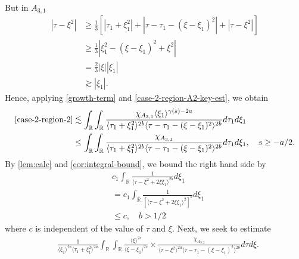 \documentclass[12pt,reqno]{amsart}
\numberwithin{equation}{section}  %
\numberwithin{figure}{section}
\newcommand{\rr}{\mathbb{R}}
\theoremstyle{plain}
\theoremstyle{definition}
\theoremstyle{remark}
\begin{document}
%
%
%
But in $A_{3,1}$
%
%
\begin{equation}
\begin{split}
  | \tau - \xi^{2} |
  & \ge \frac{1}{3} \left[ | \tau_{1} + \xi_{1}^{2} | + | \tau - \tau_{1} -
  (\xi - \xi_{1})^{2} | + | \tau - \xi^{2} | \right]
  \\
  & \ge \frac{1}{3} | \xi_{1}^{2} - (\xi - \xi_{1})^{2} + \xi^{2} |
  \\
  & = \frac{2}{3}| \xi | | \xi_{1} |
  \\
  & \gtrsim  | \xi_{1} |.
\end{split}
\label{case-2-region-A2-key-est}
\end{equation}
%
%
Hence, applying \eqref{growth-term} and \eqref{case-2-region-A2-key-est}, we obtain
%
%
%
%
\begin{equation*}
\begin{split}
  \eqref{case-2-region-2}
  & \lesssim 
  \int_{\rr} \int_{\rr} \frac{\chi_{A_{3,1}} \langle \xi_{1}
  \rangle^{\gamma(s) -2a}}{  
    \langle \tau_{1} + \xi_{1}^{2} \rangle^{2b} \langle  \tau - \tau_{1} -
    (\xi - \xi_{1})^{2} \rangle^{2b} }
    d \tau_1 d \xi_{1}
    \\
    & \le \int_{\rr} \int_{\rr} \frac{\chi_{A_{3,1}}}{  
    \langle \tau_{1} + \xi_{1}^{2} \rangle^{2b} \langle  \tau - \tau_{1} -
    (\xi - \xi_{1})^{2} \rangle^{2b} }
    d \tau_1 d \xi_{1}, \quad s \ge -a/2.
\end{split}
\end{equation*}
By \autoref{lem:calc} and \autoref{cor:integral-bound}, we bound the right hand
side by
%
%
\begin{equation*}
\begin{split}
  & c_{1} \int_{\rr}  \frac{1}{\langle \tau - \xi^{2} + 2 \xi \xi_{1} 
  \rangle ^{2b}}d \xi_{1}
  \\
  & = c_{1} \int_{\rr}  \frac{1}{\left [ \langle \tau - \xi^{2} + 2 \xi \xi_{1} 
  \rangle ^{2} \right ]^{b}}d \xi_{1}
  \\
  & \le  c, \quad b > 1/2
\end{split}
\end{equation*}
where $c$ is independent of the value of $\tau$ and $\xi$. 
Next, we seek to estimate
\begin{equation*}
\begin{split}
  &  \frac{1}{\langle \xi_{1} \rangle ^{2s}
  \langle \tau_{1} + \xi_{1}^{2}  \rangle
  ^{2a}} \int_{\rr} \int_{\rr} \frac{\langle \xi \rangle ^{2s}}{\langle
  \xi - \xi_{1}\rangle ^{2s}}  \times \frac{\chi_{A_{3,2}}}{\langle
  \tau - \xi^{2} \rangle ^{2a} \langle \tau - \tau_{1} - (\xi -
  \xi_{1})^{2} \rangle ^{2b}} d \tau d \xi.
\end{split}
\end{equation*}
\end{document}
